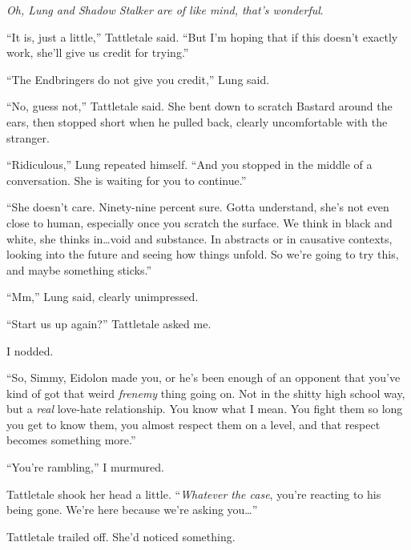 \emph{Oh, Lung and Shadow Stalker are of like mind, that's wonderful}.



``It is, just a little,'' Tattletale said.  ``But I'm hoping that if this doesn't exactly work, she'll give us credit for trying.''



``The Endbringers do not give you credit,'' Lung said.



``No, guess not,'' Tattletale said.  She bent down to scratch Bastard around the ears, then stopped short when he pulled back, clearly uncomfortable with the stranger.



``Ridiculous,'' Lung repeated himself.  ``And you stopped in the middle of a conversation.  She is waiting for you to continue.''



``She doesn't care.  Ninety-nine percent sure.  Gotta understand, she's not even close to human, especially once you scratch the surface.  We think in black and white, she thinks in\ldots void and substance.  In abstracts or in causative contexts, looking into the future and seeing how things unfold.  So we're going to try this, and maybe something sticks.''



``Mm,'' Lung said, clearly unimpressed.



``Start us up again?''  Tattletale asked me.



I nodded.



``So, Simmy, Eidolon made you, or he's been enough of an opponent that you've kind of got that weird \emph{frenemy} thing going on.  Not in the shitty high school way, but a \emph{real} love-hate relationship.  You know what I mean.  You fight them so long you get to know them, you almost respect them on a level, and that respect becomes something more.''



``You're rambling,'' I murmured.



Tattletale shook her head a little.  ``\emph{Whatever the case}, you're reacting to his being gone.  We're here because we're asking you\ldots''



Tattletale trailed off.  She'd noticed something.



